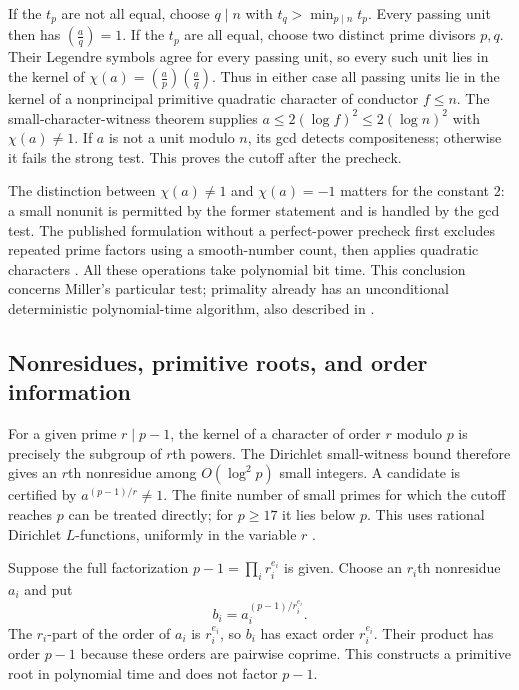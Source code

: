 \documentclass[11pt]{article}
\theoremstyle{definition}
\theoremstyle{remark}
\begin{document}
If the $t_p$ are not all equal, choose $q\mid n$ with
$t_q>\min_{p\mid n}t_p$. Every passing unit then has
$\left(\frac aq\right)=1$. If the $t_p$ are all equal, choose two distinct
prime divisors $p,q$. Their Legendre symbols agree for every passing unit,
so every such unit lies in the kernel of
$\chi(a)=\left(\frac ap\right)\left(\frac aq\right)$.
Thus in either case all passing units lie in the kernel of a nonprincipal
primitive quadratic character of conductor $f\le n$.
The small-character-witness theorem supplies
$a\le2(\log f)^2\le2(\log n)^2$ with $\chi(a)\ne1$.
If $a$ is not a unit modulo $n$, its gcd detects compositeness; otherwise
it fails the strong test. This proves the cutoff after the precheck.

The distinction between $\chi(a)\ne1$ and $\chi(a)=-1$ matters for the
constant $2$: a small nonunit is permitted by the former statement and is
handled by the gcd test. The published formulation without a perfect-power
precheck first excludes repeated prime factors using a smooth-number count,
then applies quadratic characters \citep[pp.~105--106]{Schoof2008}.
All these operations take polynomial bit time. This conclusion concerns
Miller's particular test; primality already has an unconditional deterministic
polynomial-time algorithm, also described in \citet[Section~3]{Schoof2008}.

\subsection{Nonresidues, primitive roots, and order information}

For a given prime $r\mid p-1$, the kernel of a character of order $r$
modulo $p$ is precisely the subgroup of $r$th powers. The Dirichlet
small-witness bound therefore gives an $r$th nonresidue among
$O(\log^2p)$ small integers. A candidate is certified by
$a^{(p-1)/r}\ne1$. The finite number of small primes for which the cutoff
reaches $p$ can be treated directly; for $p\ge17$ it lies below $p$.
This uses rational Dirichlet $L$-functions, uniformly in the variable $r$
\citep[pp.~1--2]{LLS2015}.

Suppose the full factorization $p-1=\prod_i r_i^{e_i}$ is given.
Choose an $r_i$th nonresidue $a_i$ and put
\[
 b_i=a_i^{(p-1)/r_i^{e_i}}.
\]
The $r_i$-part of the order of $a_i$ is $r_i^{e_i}$, so $b_i$ has exact
order $r_i^{e_i}$. Their product has order $p-1$ because these orders are
pairwise coprime. This constructs a primitive root in polynomial time and
does not factor $p-1$.
\end{document}
